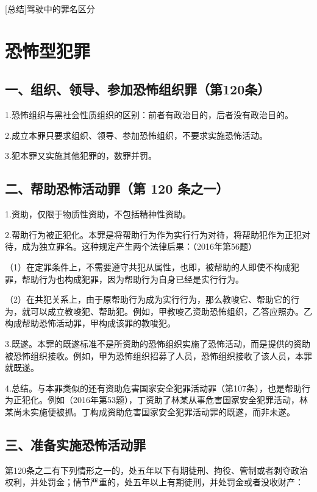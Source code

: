 [总结]驾驶中的罪名区分


\section{恐怖型犯罪}

\subsection*{一、组织、领导、参加恐怖组织罪（第120条）}

1.恐怖组织与黑社会性质组织的区别：前者有政治目的，后者没有政治目的。

2.成立本罪只要求组织、领导、参加恐怖组织，不要求实施恐怖活动。

3.犯本罪又实施其他犯罪的，数罪并罚。

\subsection*{二、帮助恐怖活动罪（第 120 条之一）}

1.资助，仅限于物质性资助，不包括精神性资助。

2.帮助行为被正犯化。本罪是将帮助行为作为实行行为对待，将帮助犯作为正犯对待，成为独立罪名。这种规定产生两个法律后果：（2016年第56题）

（1）在定罪条件上，不需要遵守共犯从属性，也即，被帮助的人即使不构成犯罪，帮助行为也构成犯罪，因为帮助行为自身已经是实行行为。

（2）在共犯关系上，由于原帮助行为成为实行行为，那么教唆它、帮助它的行为，就可以成立教唆犯、帮助犯。例如，甲教唆乙资助恐怖组织，乙答应照办。乙构成帮助恐怖活动罪，甲构成该罪的教唆犯。

3.既遂。本罪的既遂标准不是所资助的恐怖组织实施了恐怖活动，而是提供的资助被恐怖组织接收。例如，甲为恐怖组织招募了人员，恐怖组织接收了该人员，本罪就既遂。

4.总结。与本罪类似的还有资助危害国家安全犯罪活动罪（第107条），也是帮助行为正犯化。例如（2016年第53题），丁资助了林某从事危害国家安全犯罪活动，林某尚未实施便被抓。丁构成资助危害国家安全犯罪活动罪的既遂，而非未遂。

\subsection*{三、准备实施恐怖活动罪}

第120条之二有下列情形之一的，处五年以下有期徒刑、拘役、管制或者剥夺政治权利，并处罚金；情节严重的，处五年以上有期徒刑，并处罚金或者没收财产：

